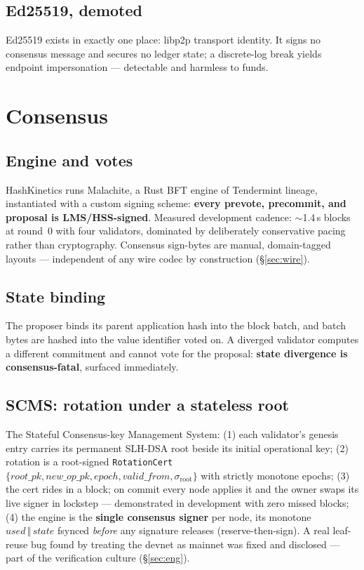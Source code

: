 \documentclass[11pt]{article}
\newcommand{\ct}[1]{\texttt{#1}}
\begin{document}
\subsection{Ed25519, demoted}
Ed25519 exists in exactly one place: libp2p transport identity. It signs no consensus message and secures no ledger state; a discrete-log break yields endpoint impersonation --- detectable and harmless to funds.

\section{Consensus}\label{sec:consensus}
\subsection{Engine and votes}
HashKinetics runs Malachite, a Rust BFT engine of Tendermint lineage, instantiated with a custom signing scheme: \textbf{every prevote, precommit, and proposal is LMS/HSS-signed}. Measured development cadence: $\sim$1.4\,s blocks at round~0 with four validators, dominated by deliberately conservative pacing rather than cryptography. Consensus sign-bytes are manual, domain-tagged layouts --- independent of any wire codec by construction (\S\ref{sec:wire}).

\subsection{State binding}
The proposer binds its parent application hash into the block batch, and batch bytes are hashed into the value identifier voted on. A diverged validator computes a different commitment and cannot vote for the proposal: \textbf{state divergence is consensus-fatal}, surfaced immediately.

\subsection{SCMS: rotation under a stateless root}\label{sec:scms}
The Stateful Consensus-key Management System: (1) each validator's genesis entry carries its permanent SLH-DSA root beside its initial operational key; (2) rotation is a root-signed \ct{RotationCert} $\{\mathit{root\_pk},\mathit{new\_op\_pk},\mathit{epoch},\mathit{valid\_from},\sigma_{\mathrm{root}}\}$ with strictly monotone epochs; (3) the cert rides in a block; on commit every node applies it and the owner swaps its live signer in lockstep --- demonstrated in development with zero missed blocks; (4) the engine is the \textbf{single consensus signer} per node, its monotone $\mathit{used}\,\Vert\,\mathit{state}$ fsynced \emph{before} any signature releases (reserve-then-sign). A real leaf-reuse bug found by treating the devnet as mainnet was fixed and disclosed --- part of the verification culture (\S\ref{sec:eng}).
\end{document}

